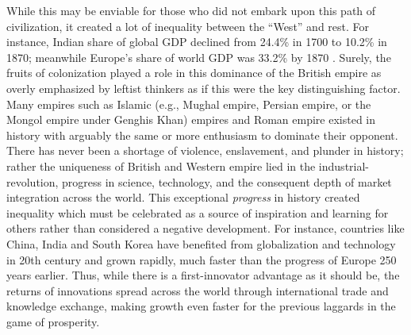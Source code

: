 \documentclass[12pt]{article}
\newcommand{\1}{\mathbbm 1}
\begin{document}
		
		While this may be enviable for those who did not embark upon this path of civilization, it created a lot of inequality between the ``West'' and rest. For instance, Indian share of global GDP declined from 24.4\% in 1700 to 10.2\% in 1870; meanwhile Europe's share of world GDP was 33.2\% by 1870 \cite{maddison2006world}. Surely, the fruits of colonization played a role in this dominance of the British empire as overly emphasized by leftist thinkers as if this were the key distinguishing factor. Many empires such as Islamic (e.g., Mughal empire, Persian empire, or the Mongol empire under Genghis Khan) empires and Roman empire existed in history with arguably the same or more enthusiasm to dominate their opponent. There has never been a shortage of violence, enslavement, and plunder in history; rather the uniqueness of British and Western empire lied in the industrial-revolution, progress in science, technology, and the consequent depth of market integration across the world.  This exceptional \textit{progress} in history created inequality which must be celebrated as a source of inspiration and learning for others rather than considered a negative development. For instance, countries like China, India and South Korea have benefited from globalization and technology in 20th century and grown rapidly, much faster than the progress of Europe 250 years earlier. Thus, while there is a first-innovator advantage as it should be, the returns of innovations spread across the world through international trade and knowledge exchange, making growth even faster for the previous laggards in the game of prosperity.
		
		
		
		
		
		
	 
		
		
		
		
		
\end{document}
